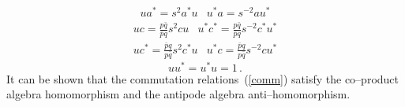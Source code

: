 \documentclass[a4paper,12pt]{article}
\numberwithin{equation}{section}
\begin{document}
$$
\begin{array}{cc}
u a^\ast = s^2 a^\ast u & u^\ast a = s^{-2} a u^\ast 
\end{array}
$$
$$
\begin{array}{cc}
u c = \frac{p \bar q}{\bar p q} s^2 c u & u^\ast c^\ast = \frac{p \bar q}{\bar p q} s^{-2} c^\ast u^\ast 
\end{array}
$$
$$
\begin{array}{cc}
u c^\ast = \frac{\bar p q}{p \bar q} s^2 c^\ast u & u^\ast c = \frac{\bar p q}{p \bar q} s^{-2}c u^\ast 
\end{array}
$$
\begin{equation}\label{comm}
u u^\ast = u^\ast u = 1 \, .
\end{equation}
It can be shown that the commutation relations~(\ref{comm}) satisfy the co--product algebra homomorphism
 and the antipode algebra anti--homomorphism.
\end{document}
